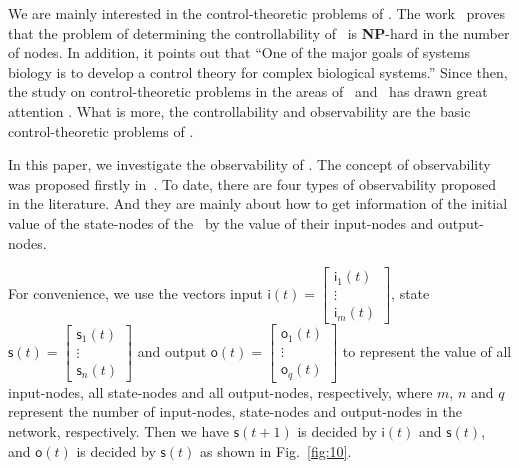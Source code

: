 We are mainly interested in the control-theoretic problems of \BCNs. The work~\cite{Akutsu2007Control} proves that the problem of determining the controllability of \BCNs\ is {\bf NP}-hard in the number of nodes. In addition, it points out that ``One of the major goals of systems biology is to develop a control theory for complex biological systems.'' Since then, the study on control-theoretic problems in the areas of \BNs\ and \BCNs\ has drawn great attention \cite{cheng2009controllability, Zhao2010Input, Cheng2011Identification, Cheng2011Analysis,Fornasini2013Observability}. What is more, the controllability and observability are the basic control-theoretic problems of \BCNs. %

In this paper, we investigate the observability of \BCNs. The concept of observability was proposed firstly in~\cite{cheng2009controllability}. To date, there are four types of observability proposed in the literature. And they are mainly about how to get  information of the initial value of the state-nodes of the \BCNs\ by the value of their input-nodes and output-nodes. 

For convenience, we use the vectors input $\mathsf{i}(t)=\begin{bmatrix}\mathsf{i}_1(t)\\ \vdots \\\mathsf{i}_m(t)\end{bmatrix}$, state $\mathsf{s}(t)=\begin{bmatrix}\mathsf{s}_1(t)\\ \vdots \\\mathsf{s}_n(t)\end{bmatrix}$ and output $\mathsf{o}(t)=\begin{bmatrix}\mathsf{o}_1(t)\\ \vdots \\\mathsf{o}_q(t)\end{bmatrix}$ to represent the value of all input-nodes, all state-nodes and all output-nodes, respectively, where $m$, $n$ and $q$ represent the number of input-nodes, state-nodes and output-nodes in the network, respectively. 
 Then we have $\mathsf{s}(t+1)$ is decided by $\mathsf{i}(t)$ and $\mathsf{s}(t)$, and $\mathsf{o}(t)$ is decided by $\mathsf{s}(t)$ as shown in Fig.~\ref{fig:10}.


